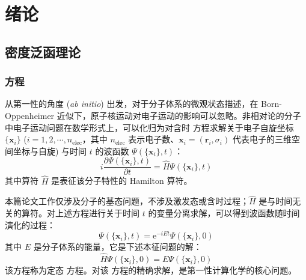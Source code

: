 
\chapter{绪论}

\section{密度泛函理论}

\subsection{\Schrodinger 方程}

从第一性的角度 (\emph{ab initio}) 出发，对于分子体系的微观状态描述，在 Born-Oppenheimer 近似下\cite{Born-Oppenheimer.AP.1927}，原子核运动对电子运动的影响可以忽略。非相对论的分子中电子运动问题在数学形式上，可以化归为对含时 \Schrodinger 方程\cite{Schroedinger-Schroedinger.PR.1926}求解关于电子自旋坐标 $\{\bm{x}_i\}$ ($i = 1, 2, \cdots, n_\mathrm{elec}$，其中 $n_\mathrm{elec}$ 表示电子数、$\bm{x}_i = (\bm{r}_i, \sigma_i)$ 代表电子的三维空间坐标与自旋) 与时间 $t$ 的波函数 $\Psi(\{\bm{x}_i\}, t)$：
\begin{equation}
  i \frac{\partial \Psi(\{\bm{x}_i\}, t)}{\partial t} = \hat H \Psi(\{\bm{x}_i\}, t)
\end{equation}
其中算符 $\hat H$ 是表征该分子特性的 Hamilton 算符。

本篇论文工作仅涉及分子的基态问题，不涉及激发态或含时过程；$\hat H$ 是与时间无关的算符。对上述方程进行关于时间 $t$ 的变量分离求解，可以得到波函数随时间演化的过程：
\begin{equation}
  \Psi(\{\bm{x}_i\}, t) = \mathrm{e}^{- i E t} \Psi(\{\bm{x}_i\}, 0)
\end{equation}
其中 $E$ 是分子体系的能量，它是下述本征问题的解：
\begin{equation}
  \label{eq.tise}
  \hat H \Psi(\{\bm{x}_i\}, 0) = E \Psi(\{\bm{x}_i\}, 0)
\end{equation}
该方程称为定态 \Schrodinger 方程。对该 \Schrodinger 方程的精确求解，是第一性计算化学的核心问题。

